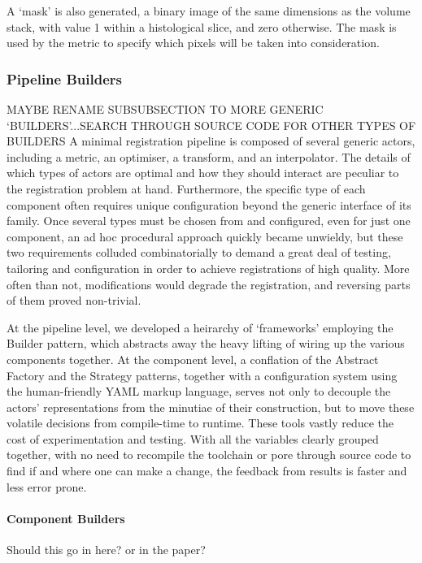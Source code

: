       A `mask' is also generated, a binary image of the same dimensions as the volume stack, with value 1 within a histological slice, and zero otherwise. The mask is used by the metric to specify which pixels will be taken into consideration.
    
    \subsubsection{Pipeline Builders} %
    \label{ssub:pipeline_builders}
      MAYBE RENAME SUBSUBSECTION TO MORE GENERIC `BUILDERS'...SEARCH THROUGH SOURCE CODE FOR OTHER TYPES OF BUILDERS
          A minimal registration pipeline is composed of several generic actors, including a metric, an optimiser, a transform, and an interpolator. The details of which types of actors are optimal and how they should interact are peculiar to the registration problem at hand. Furthermore, the specific type of each component often requires unique configuration beyond the generic interface of its family. Once several types must be chosen from and configured, even for just one component, an ad hoc procedural approach quickly became unwieldy, but these two requirements colluded combinatorially to demand a great deal of testing, tailoring and configuration in order to achieve registrations of high quality. More often than not, modifications would degrade the registration, and reversing parts of them proved non-trivial.

          At the pipeline level, we developed a heirarchy of `frameworks' employing the Builder pattern, which abstracts away the heavy lifting of wiring up the various components together.  At the component level, a conflation of the Abstract Factory and the Strategy patterns, together with a configuration system using the human-friendly YAML markup language, serves not only to decouple the actors' representations from the minutiae of their construction, but to move these volatile decisions from compile-time to runtime. These tools vastly reduce the cost of experimentation and testing. With all the variables clearly grouped together, with no need to recompile the toolchain or pore through source code to find if and where one can make a change, the feedback from results is faster and less error prone.

      
        \paragraph{Component Builders}
        Should this go in here? or in the paper?

